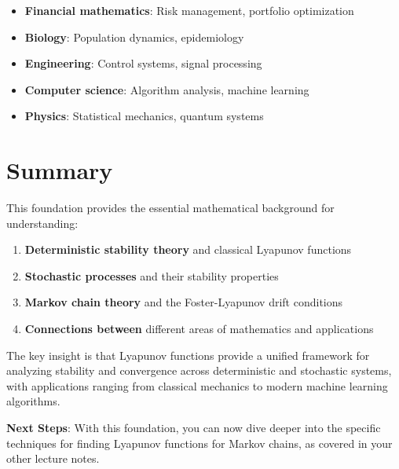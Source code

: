 \documentclass{amsart}
\theoremstyle{plain}
\theoremstyle{definition}
\theoremstyle{remark}
\begin{document}
\begin{itemize}
	\item \textbf{Financial mathematics}: Risk management, portfolio optimization
	\item \textbf{Biology}: Population dynamics, epidemiology
	\item \textbf{Engineering}: Control systems, signal processing
	\item \textbf{Computer science}: Algorithm analysis, machine learning
	\item \textbf{Physics}: Statistical mechanics, quantum systems
\end{itemize}

\section{Summary}

This foundation provides the essential mathematical background for understanding:

\begin{enumerate}
	\item \textbf{Deterministic stability theory} and classical Lyapunov functions
	\item \textbf{Stochastic processes} and their stability properties
	\item \textbf{Markov chain theory} and the Foster-Lyapunov drift conditions
	\item \textbf{Connections between} different areas of mathematics and applications
\end{enumerate}

The key insight is that Lyapunov functions provide a unified framework for analyzing stability and convergence across deterministic and stochastic systems, with applications ranging from classical mechanics to modern machine learning algorithms.

\textbf{Next Steps}: With this foundation, you can now dive deeper into the specific techniques for finding Lyapunov functions for Markov chains, as covered in your other lecture notes.
\end{document}
